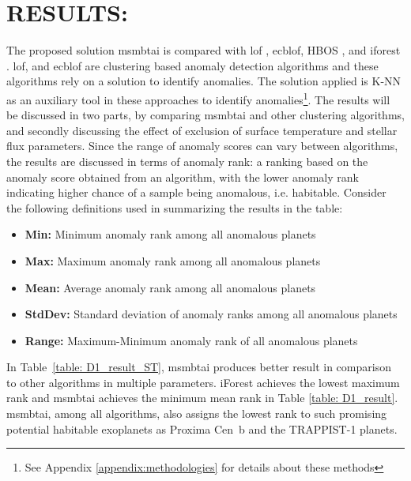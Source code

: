 \documentclass[fleqn,usenatbib]{mnras}
\begin{document}
\section{RESULTS:} The proposed solution \acrshort{msmbtai} is compared with \acrfull{lof} \citep{10.1145/335191.335437}, \acrshort{ecblof}, HBOS \citep{inproceedings}, and \acrshort{iforest} \citep{iforest}. \acrshort{lof}, and \acrshort{ecblof} are clustering based anomaly detection algorithms and these algorithms rely on a solution to identify anomalies. The solution applied is K-NN as an auxiliary tool in these approaches to identify anomalies\footnote{See Appendix \ref{appendix:methodologies} for details about these methods}. The results will be discussed in two parts, by comparing \acrshort{msmbtai} and other clustering algorithms, and secondly discussing the effect of exclusion of surface temperature and stellar flux parameters. Since the range of anomaly scores can vary between algorithms, the results are discussed in terms of anomaly rank: a ranking based on the anomaly score obtained from an algorithm, with the lower anomaly rank indicating higher chance of a sample being anomalous, i.e. habitable. Consider the following definitions used in summarizing the results in the table:
\begin{itemize}
    \item \textbf{Min:} Minimum anomaly rank among all anomalous planets
    \item \textbf{Max:} Maximum anomaly rank among all anomalous planets
    \item \textbf{Mean:} Average anomaly rank among all anomalous planets
    \item \textbf{StdDev:} Standard deviation of anomaly ranks among all anomalous planets
    \item \textbf{Range:} Maximum-Minimum anomaly rank of all anomalous planets
\end{itemize}
In Table~\ref{table: D1_result_ST}, \acrshort{msmbtai} produces better result in comparison to other algorithms in multiple parameters. iForest achieves the lowest maximum rank and  \acrshort{msmbtai} achieves the minimum mean rank in Table \ref{table: D1_result}. \acrshort{msmbtai}, among all algorithms, also assigns the lowest rank to such promising potential habitable exoplanets as Proxima Cen~b and the TRAPPIST-1 planets.  
\end{document}
